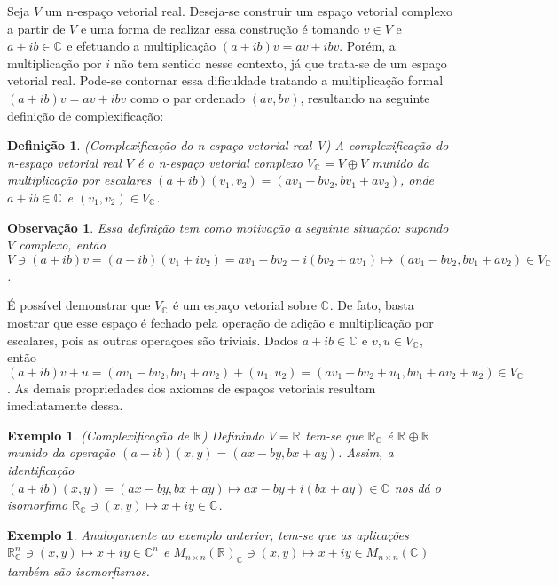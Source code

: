 \documentclass[12pt]{book}
\newtheorem{definicao}[teorema]{Definição}
\newtheorem{exemplo}[teorema]{Exemplo}
\newtheorem{observacao}[teorema]{Observação}
\newcommand{\complexificacao}[1]{#1_{\complexo{}}}
\newcommand{\complexo}[1]{\mathbb{C}^{#1}}
\newcommand{\matrizquadcomplexa}[1]{M_{#1 \times #1}(\complexo{})}
\newcommand{\matrizquadreal}[1]{M_{#1 \times #1}(\real{})}
\newcommand{\real}[1]{\mathbb{R}^{#1}}
\newcommand{\reta}{\real{}}
\begin{document}
	Seja $V$ um n-espaço vetorial real. Deseja-se construir um espaço vetorial complexo a partir de $V$ e uma forma de realizar essa construção é tomando $v \in V $ e $a+ib \in \complexo{}$ e efetuando a multiplicação $(a+ib)v = av+ibv$. Porém, a multiplicação por $i$ não tem sentido nesse contexto, já que trata-se de um espaço vetorial real. Pode-se contornar essa dificuldade tratando a multiplicação formal $(a+ib)v = av+ibv$ como o par ordenado $(av, bv)$, resultando na seguinte definição de complexificação:
	
	\begin{definicao}
		(Complexificação do n-espaço vetorial real V) A complexificação do n-espaço vetorial real $V$ é o n-espaço vetorial complexo $\complexificacao{V}=V\oplus V$ munido da multiplicação por escalares $(a+ib)(v_{1}, v_{2}) = (av_{1}-bv_{2}, bv_{1}+ av_{2})$, onde $a+ib \in \complexo{}$ e $(v_{1}, v_{2})\in \complexificacao{V}$.
	\end{definicao}
	
	\begin{observacao}
		Essa definição tem como motivação a seguinte situação: supondo $V$ complexo, então $V \ni (a+ib)v = (a+ib)(v_{1}+iv_{2}) = av_{1}-bv_{2}+i(bv_{2}+av_{1}) \mapsto (av_{1}-bv_{2}, bv_{1}+ av_{2}) \in \complexificacao{V}$.
	\end{observacao}
	
	É possível demonstrar que $\complexificacao{V}$ é um espaço vetorial sobre $\complexo{}$. De fato, basta mostrar que esse espaço é fechado pela operação de adição e multiplicação por escalares, pois as outras operaçoes são triviais. Dados $a+ib \in \complexo{}$ e $v,u \in \complexificacao{V}$, então $(a+ib )v+u = (av_{1}-bv_{2}, bv_{1}+ av_{2}) + (u_{1}, u_{2}) = (av_{1}-bv_{2} + u_{1}, bv_{1}+ av_{2} + u_{2}) \in \complexificacao{V}$. As demais propriedades dos axiomas de espaços vetoriais resultam imediatamente dessa.
	
	\begin{exemplo}\label{exemplo_conjugado_reta_real}
		(Complexificação de $\reta$) Definindo $V = \reta$ tem-se que $\complexificacao{\reta}$ é $\reta\oplus \reta$ munido da operação $(a+ib)(x,y) = (ax-by, bx+ay)$. Assim, a identificação $(a+ib)(x, y ) = (ax-by, bx+ay) \mapsto ax-by+i(bx+ay) \in \complexo{}$ nos dá o isomorfimo $\complexificacao{\reta} \ni (x,y)\mapsto x +iy\in \complexo{}$.
	\end{exemplo}
	
	\begin{exemplo}\label{exemplo_complexificacao_matrizes}
		Analogamente ao exemplo anterior, tem-se que as aplicações $\complexificacao{\real{n}} \ni (x,y) \mapsto x+iy \in \complexo{n}$ e  $\complexificacao{\matrizquadreal{n}} \ni (x,y) \mapsto x+iy \in \matrizquadcomplexa{n}$ também são isomorfismos.
	\end{exemplo}
	
\end{document}
